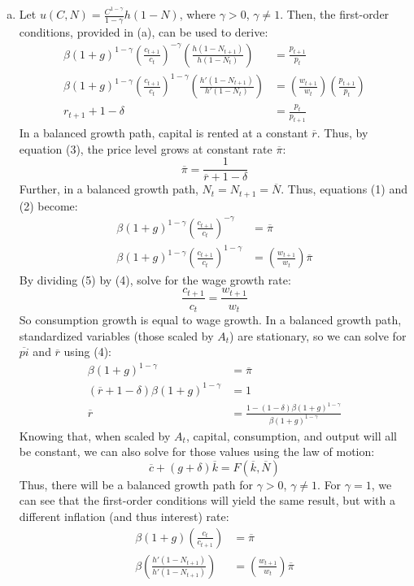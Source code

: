 \documentclass{article}
\begin{document}
\begin{enumerate}[(a)]
	\item Let $u(C,N) = \frac{C^{1-\gamma}}{1-\gamma}h(1-N)$, where $\gamma>0$, $\gamma\neq 1$. Then, the first-order conditions, provided in (a), can be used to derive:
		\begin{align}
			\beta(1+g)^{1-\gamma}\left(\frac{c_{t+1}}{c_t}\right)^{-\gamma}\left(\frac{h(1-N_{t+1})}{h(1-N_t)}\right) &= \frac{p_{t+1}}{p_t}	\\
			\beta(1+g)^{1-\gamma}\left(\frac{c_{t+1}}{c_t}\right)^{1-\gamma}\left(\frac{h'(1-N_{t+1})}{h'(1-N_t)}\right) &= \left(\frac{w_{t+1}}{w_t}\right)\left(\frac{p_{t+1}}{p_t}\right)	\\
			r_{t+1} + 1 - \delta &= \frac{p_t}{p_{t+1}}
		\end{align}
		In a balanced growth path, capital is rented at a constant $\overline{r}$. Thus, by equation (3), the price level grows at constant rate $\overline{\pi}$:
			\[
				\overline{\pi} = \frac{1}{\overline{r} + 1 - \delta}
			\]
		Further, in a balanced growth path, ${N_t=N_{t+1}=\overline{N}}$. Thus, equations (1) and (2) become:
		\begin{align}
			\beta(1+g)^{1-\gamma}\left(\frac{c_{t+1}}{c_t}\right)^{-\gamma} &= \overline{\pi}	\\
			\beta(1+g)^{1-\gamma}\left(\frac{c_{t+1}}{c_t}\right)^{1-\gamma} &= \left(\frac{w_{t+1}}{w_t}\right)\overline{\pi}
		\end{align}
		By dividing (5) by (4), solve for the wage growth rate:
		\[
			\frac{c_{t+1}}{c_t} = \frac{w_{t+1}}{w_t}
		\]
		So consumption growth is equal to wage growth. In a balanced growth path, standardized variables (those scaled by $A_t$) are stationary, so we can solve for $\overline{pi}$ and $\overline{r}$ using (4):
		\begin{align*}
			\beta(1+g)^{1-\gamma} &= \overline{\pi}	\\
			(\overline{r} + 1 - \delta)\beta(1+g)^{1-\gamma} &= 1	\\
			\overline{r} &= \frac{1 - (1-\delta)\beta(1+g)^{1-\gamma}}{\beta(1+g)^{1-\gamma}}
		\end{align*}
		Knowing that, when scaled by $A_t$, capital, consumption, and output will all be constant, we can also solve for those values using the law of motion:
		\[
			\overline{c} + (g+\delta)\overline{k} = F(\overline{k},\overline{N})
		\]
		Thus, there will be a balanced growth path for $\gamma >0$, $\gamma\neq 1$. For $\gamma=1$, we can see that the first-order conditions will yield the same result, but with a different inflation (and thus interest) rate:
		\begin{align*}
			\beta(1+g)\left(\frac{c_t}{c_{t+1}}\right) &= \overline{\pi}	\\
			\beta\left(\frac{h'(1-N_{t+1})}{h'(1-N_{t+1})}\right) &= \left(\frac{w_{t+1}}{w_t}\right)\overline{\pi}
		\end{align*}
		

\end{enumerate}
\end{document}
